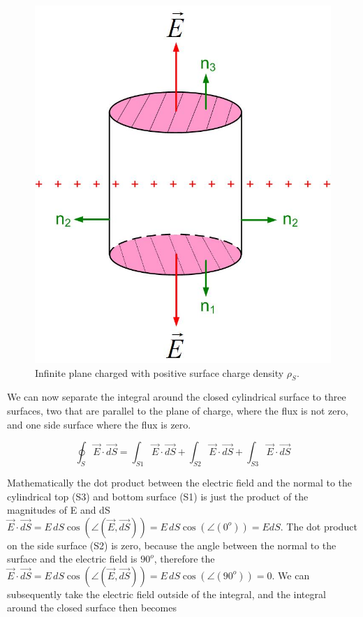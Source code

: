 \documentclass{ximera}
\begin{document}
\begin{figure}[htbp]
\begin{center}
\includegraphics[scale=0.5]{../jpg/infiniteplaneofcharge.jpg}
\end{center}
\caption{Infinite plane charged with positive surface charge density $\rho_S$.}
\label{fig:gaussPlane}
\end{figure}


We can now separate the integral around the closed cylindrical surface to three surfaces, two that are parallel to the plane of charge, where the flux is not zero, and one side surface where the flux is zero.

 
\begin{equation}
\oint_S \vec{E} \cdot \vec{dS} = \int_{S1}  \vec{E} \cdot \vec{dS} +\int_{S2}  \vec{E} \cdot \vec{dS}+\int_{S3}  \vec{E} \cdot \vec{dS} 
\end{equation}



 Mathematically the dot product between the electric field and the normal to the cylindrical top (S3) and bottom surface (S1) is just the product of the magnitudes of E and dS $\vec{E} \cdot \vec{dS}= E \,dS  \cos(\angle(\vec{E},\vec{dS}))= E \,dS  \cos(\angle(0^o)) =E dS$. The dot product on the side surface (S2) is zero, because the angle between the normal to the surface and the electric field is $90^o$, therefore the $\vec{E} \cdot \vec{dS}= E \,dS  \cos(\angle(\vec{E},\vec{dS}))= E \,dS  \cos(\angle(90^o)) =0$. We can subsequently take the electric field outside of the integral, and the integral around the closed surface then becomes
 
\end{document}
